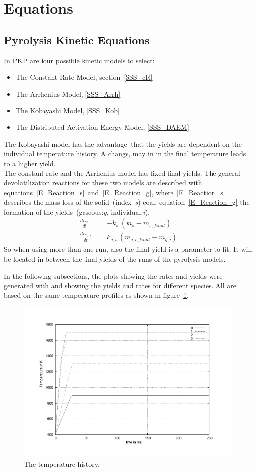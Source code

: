 
\section{Equations}\label{S_Eq}

\subsection{Pyrolysis Kinetic Equations}\label{SS_KinEq}
In PKP are four possible kinetic models to select:
\begin{itemize}
 \item The Constant Rate Model, section~\ref{SSS_cR}
 \item The Arrhenius Model, \ref{SSS_Arrh}
 \item The Kobayashi Model, \ref{SSS_Kob}
 \item The Distributed Activation Energy Model, \ref{SSS_DAEM}
\end{itemize}
The Kobayashi model has the advantage, that the yields are dependent on the individual temperature history. A change, may in in the final temperature leads to a higher yield.\\
The constant rate and the Arrhenius model has fixed final yields. The general devolatilization reactions for these two models are described with equations~\ref{E_Reaction_s}~and~\ref{E_Reaction_g}, where~\ref{E_Reaction_s} describes the mass loss of the solid~(index~\textit{s}) coal, equation~\ref{E_Reaction_g} the formation of the yields~(gaseous:\textit{g}, individual:\textit{i}).
\begin{align}
\label{E_Reaction_s}
 \frac{dm_{s}}{dt}&=-k_s \: \left( m_{s} - m_{s,final} \right)\\
\label{E_Reaction_g}
 \frac{dm_{g,i}}{dt}&=k_{g,i} \: \left(m_{g,i,final} - m_{g,i}\right)  
\end{align}
So when using more than one run, also the final yield is a parameter to fit. It will be located in between the final yields of the runs of the pyrolysis models.

In the following subsections, the plots showing the rates and yields were generated with \CPD and \FGDVC showing the yields and rates for different species. All are based on the same temperature profiles as shown in figure~\ref{F_Tt}.
\begin{figure}
\centering%
\includegraphics[height=8cm,angle=0]{Figures/tempHist}
\caption{The temperature history.}
\label{F_Tt}
\end{figure}

